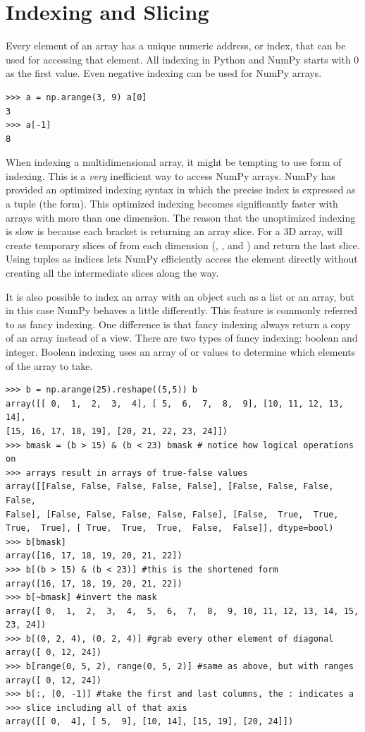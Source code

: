 \section*{Indexing and Slicing} Every element of an array has a unique
numeric address, or index, that can be used for accessing that element.
All indexing in Python and NumPy starts with 0 as the first value. Even
negative indexing can be used for NumPy arrays. \begin{lstlisting}
>>> a = np.arange(3, 9) a[0]
3
>>> a[-1]
8 \end{lstlisting} When indexing a multidimensional array, it might be
tempting to use  form of indexing. This is a \emph{very}
inefficient way to access NumPy arrays. NumPy has provided an optimized
indexing syntax in which the precise index is expressed as a tuple (the
 form).  This optimized indexing becomes significantly
faster with arrays with more than one dimension. The reason that the
unoptimized indexing is slow is because each bracket is returning an
array slice. For a 3D array,  will create temporary
slices of  from each dimension (, , and
) and return the last slice. Using tuples as indices lets
NumPy efficiently access the element directly without creating all the
intermediate slices along the way.

It is also possible to index an array with an object such as a list or
an array, but in this case NumPy behaves a little differently. This
feature is commonly referred to as fancy indexing. One difference is
that fancy indexing always return a copy of an array instead of a view.
There are two types of fancy indexing: boolean and integer. Boolean
indexing uses an array of  or  values to determine
which elements of the array to take. \begin{lstlisting}
>>> b = np.arange(25).reshape((5,5)) b
array([[ 0,  1,  2,  3,  4], [ 5,  6,  7,  8,  9], [10, 11, 12, 13, 14],
[15, 16, 17, 18, 19], [20, 21, 22, 23, 24]])
>>> bmask = (b > 15) & (b < 23) bmask # notice how logical operations on
>>> arrays result in arrays of true-false values
array([[False, False, False, False, False], [False, False, False, False,
False], [False, False, False, False, False], [False,  True,  True, 
True,  True], [ True,  True,  True,  False,  False]], dtype=bool)
>>> b[bmask]
array([16, 17, 18, 19, 20, 21, 22])
>>> b[(b > 15) & (b < 23)] #this is the shortened form
array([16, 17, 18, 19, 20, 21, 22])
>>> b[~bmask] #invert the mask
array([ 0,  1,  2,  3,  4,  5,  6,  7,  8,  9, 10, 11, 12, 13, 14, 15,
23, 24])
>>> b[(0, 2, 4), (0, 2, 4)] #grab every other element of diagonal
array([ 0, 12, 24])
>>> b[range(0, 5, 2), range(0, 5, 2)] #same as above, but with ranges
array([ 0, 12, 24])
>>> b[:, [0, -1]] #take the first and last columns, the : indicates a
>>> slice including all of that axis
array([[ 0,  4], [ 5,  9], [10, 14], [15, 19], [20, 24]])
\end{lstlisting}

